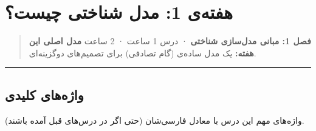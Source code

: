 \section{هفته‌ی 1: مدل شناختی چیست؟}

\begin{quote}
\textbf{فصل 1: مبانی مدل‌سازی شناختی} · درس 1 ساعت ·  2 ساعت
\textbf{مدل اصلی این هفته:} یک مدل ساده‌ی  (گام تصادفی)
برای تصمیم‌های دوگزینه‌ای.
\end{quote}

\begin{center}\rule{0.5\linewidth}{0.5pt}\end{center}

\subsection{واژه‌های کلیدی}

واژه‌های مهم این درس با معادل فارسی‌شان (حتی اگر در درس‌های قبل آمده
باشند).

